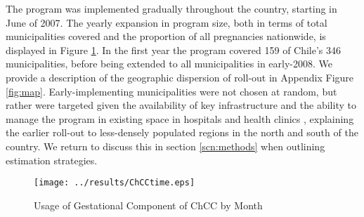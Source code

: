 \documentclass[12pt]{article}
\begin{document}
\begin{spacing}{1.4}
The program was implemented gradually throughout the country, starting
in June of 2007.  The yearly expansion in program size, both in terms of
total municipalities covered and the proportion of all pregnancies
nationwide, is displayed in Figure \ref{fig:coverage}. In the first year
the program covered 159 of Chile's 346 municipalities, before being
extended to all municipalities in early-2008.  We provide a description
of the geographic dispersion of roll-out in Appendix Figure \ref{fig:map}.
Early-implementing municipalities were not chosen at random, but rather
were targeted given the availability of key infrastructure and the ability to
manage the program in existing space in hospitals and health clinics
\citep{Arrietetal2013}, explaining the earlier roll-out to less-densely
populated regions in the north and south of the country.  We return to
discuss this in section \ref{scn:methods} when outlining estimation
strategies.

\begin{figure}[ht!]
  \begin{center}
    \centering
    \caption{Usage of Gestational Component of ChCC by Month}
    \texttt{[image: ../results/ChCCtime.eps]}
    \label{fig:coverage}
  \end{center}
  \vspace{-5mm}
\end{figure}


\end{spacing}
\end{document}
